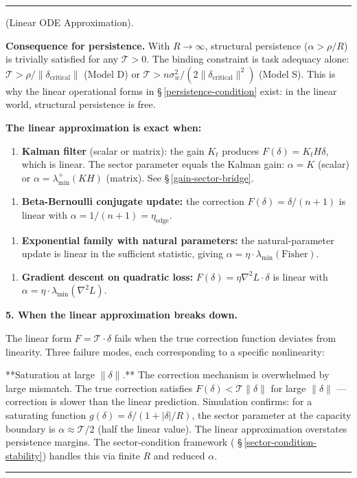 \documentclass[11pt,oneside]{article}
\newcounter{claim}[section]
\renewcommand{\theclaim}{\thesection.\arabic{claim}}
\newenvironment{segment}[2]{%
  \refstepcounter{claim}%
  \bigskip\noindent\hrule\smallskip
  \noindent{\bfseries #1~\theclaim}\enskip(#2).\par\smallskip
  \noindent\ignorespaces
}{%
  \par\smallskip\noindent\hrule\bigskip
}
\newenvironment{detail}[1][]{\begin{segment}{Detail}{#1}}{\end{segment}}
\begin{document}
\begin{detail}[Linear ODE Approximation]
\textbf{Consequence for persistence.} With $R \to \infty$, structural persistence ($\alpha > \rho/R$) is trivially satisfied for any $\mathcal{T} > 0$. The binding constraint is task adequacy alone: $\mathcal{T} > \rho/\lVert\delta_{\text{critical}}\rVert$ (Model D) or $\mathcal{T} > n\sigma_w^2 / (2\lVert\delta_{\text{critical}}\rVert^2)$ (Model S). This is why the linear operational forms in \S\,\ref{persistence-condition} exist: in the linear world, structural persistence is free.

\textbf{The linear approximation is exact when:}

\begin{enumerate}
  \item \textbf{Kalman filter} (scalar or matrix): the gain $K_t$ produces $F(\delta) = K_t H \delta$, which is linear. The sector parameter equals the Kalman gain: $\alpha = K$ (scalar) or $\alpha = \lambda_{\min}^+(KH)$ (matrix). See \S\,\ref{gain-sector-bridge}.
\end{enumerate}


\begin{enumerate}
  \item \textbf{Beta-Bernoulli conjugate update:} the correction $F(\delta) = \delta/(n+1)$ is linear with $\alpha = 1/(n+1) = \eta_{\text{edge}}$.
\end{enumerate}


\begin{enumerate}
  \item \textbf{Exponential family with natural parameters:} the natural-parameter update is linear in the sufficient statistic, giving $\alpha = \eta \cdot \lambda_{\min}(\text{Fisher})$.
\end{enumerate}


\begin{enumerate}
  \item \textbf{Gradient descent on quadratic loss:} $F(\delta) = \eta \nabla^2 L \cdot \delta$ is linear with $\alpha = \eta \cdot \lambda_{\min}(\nabla^2 L)$.
\end{enumerate}



\medskip\noindent\textbf{5. When the linear approximation breaks down.}


The linear form $F = \mathcal{T} \cdot \delta$ fails when the true correction function deviates from linearity. Three failure modes, each corresponding to a specific nonlinearity:

**Saturation at large $\lVert\delta\rVert$.** The correction mechanism is overwhelmed by large mismatch. The true correction satisfies $F(\delta) < \mathcal{T}\lVert\delta\rVert$ for large $\lVert\delta\rVert$ — correction is slower than the linear prediction. Simulation confirms: for a saturating function $g(\delta) = \delta / (1 + \lvert\delta\rvert/R)$, the sector parameter at the capacity boundary is $\alpha \approx \mathcal{T}/2$ (half the linear value). The linear approximation overstates persistence margins. The sector-condition framework ( \S\,\ref{sector-condition-stability}) handles this via finite $R$ and reduced $\alpha$.


\end{detail}
\end{document}
